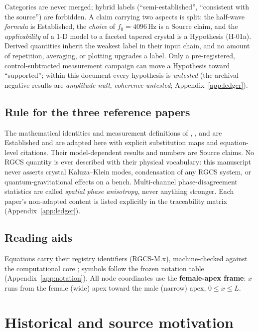 \documentclass[10pt,letterpaper]{article}
\newcommand{\eqid}[1]{\textcolor{inkgray}{\scriptsize\textsf{#1}}}
\begin{document}
Categories are never merged; hybrid labels (``semi-established'',
``consistent with the source'') are forbidden. A claim carrying two aspects
is split: the half-wave \emph{formula} is Established, the \emph{choice} of
$f_0 = 4096$\,Hz is a Source claim, and the \emph{applicability} of a 1-D
model to a faceted tapered crystal is a Hypothesis (H-01a). Derived
quantities inherit the weakest label in their input chain, and no amount of
repetition, averaging, or plotting upgrades a label. Only a pre-registered,
control-subtracted measurement campaign can move a Hypothesis toward
``supported''; within this document every hypothesis is \emph{untested}
(the archival negative results are \emph{amplitude-null,
coherence-untested}; Appendix~\ref{app:ledger}).

\subsection{Rule for the three reference papers}\label{sec:paperrule}

The mathematical identities and measurement definitions of
\citet{leetsai2026}, \citet{gan2025}, and \citet{koster2026} are Established
and are adapted here with explicit substitution maps and equation-level
citations. Their model-dependent results and numbers are Source claims. No
RGCS quantity is ever described with their physical vocabulary: this
manuscript never asserts crystal Kaluza--Klein modes, condensation of any
RGCS system, or quantum-gravitational effects on a bench. Multi-channel
phase-disagreement statistics are called \emph{spatial phase anisotropy},
never anything stronger. Each paper's non-adapted content is listed
explicitly in the traceability matrix (Appendix~\ref{app:ledger}).

\subsection{Reading aids}

Equations carry their registry identifiers (\eqid{RGCS-M.x}), machine-checked
against the computational core \citep{rgcscore2026}; symbols follow the
frozen notation table (Appendix~\ref{app:notation}). All node coordinates
use the \textbf{female-apex frame}: $x$ runs from the female (wide) apex
toward the male (narrow) apex, $0 \le x \le L$.

\section{Historical and source motivation}\label{sec:history}
\end{document}
